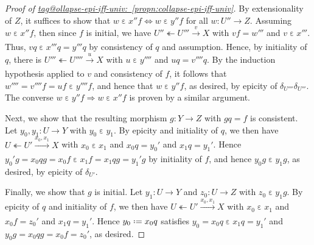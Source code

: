 \documentclass{amsart}
\makeatletter
\newcommand\defeq{\mathrel{\vcenter{\baselineskip0.5ex \lineskiplimit0pt \hbox{.}\hbox{.}}} =}
\newcommand\ein{\mathrel{\varepsilon}}
\newcommand\oot{\twoheadleftarrow}
\newcommand\ToT{\Leftrightarrow}
\newcommand\tox[2][]{\xrightarrow[#1]{#2}}
\newcommand\To{\Rightarrow}
\newcommand\tagword[1]{\csname tag@#1\endcsname}
\def\label@tag#1:#2\@nil{#1}
\newcommand\labeltag[1]{\label@tag#1:\@nil}
\newcommand\jref[1]{%
  \texorpdfstring%
    {\hyperref[#1]{\tagword{\labeltag{#1}}~\ref*{#1}}}%
    {\tagword{\labeltag{#1}}~\ref*{#1}}%
}
\theoremstyle{definition}
\theoremstyle{remark}
\theoremstyle{plainwithref}
\makeatother
\begin{document}
\begin{proof}[Proof of \jref{propn:collapse-epi-iff-univ}]
  By extensionality of \( Z \), it suffices to show that \( w \ein x'' f \ToT w \ein y'' f \) for all \( w \colon U'' \to Z \).
  Assuming \( w \ein x'' f \), then since \( f \) is initial, we have \( U'' \oot U''' \tox{v} X \) with \( v f = w''' \) and \( v \ein x''' \).
  Thus, \( v q \ein x''' q = y''' q \) by consistency of \( q \) and assumption.
  Hence, by initiality of \( q \), there is \( U''' \oot U'''' \tox{u} X \) with \( u \ein y'''' \) and \( u q = v'''' q \).
  By the induction hypothesis applied to \( v \) and consistency of \( f \), it follows that \( w'''' = v'''' f = u f \ein y'''' f \), and hence that \( w \ein y'' f \), as desired, by epicity of \( \delta_{U''''} \delta_{U'''} \).
  The converse \( w \ein y'' f \To w \ein x'' f \) is proven by a similar argument.

  Next, we show that the resulting morphism \( g \colon Y \to Z \) with \( g q = f \) is consistent.
  Let \( y_0, y_1 \colon U \to Y \) with \( y_0 \ein y_1 \).
  By epicity and initiality of \( q \), we then have \( U \oot U' \tox{x_0,x_1} X \) with \( x_0 \ein x_1 \) and \( x_0 q = y_0'  \) and \( x_1 q = y_1' \).
  Hence \( y_0' g = x_0 q g = x_0 f \ein x_1 f = x_1 q g = y_1' g \) by initiality of \( f \), and hence \( y_0 g \ein y_1 g \), as desired, by epicity of \( \delta_{U'} \).

  Finally, we show that \( g \) is initial.
  Let \( y_1 \colon U \to Y \) and \( z_0 \colon U \to Z \) with \( z_0 \ein y_1 g \).
  By epicity of \( q \) and initiality of \( f \), we then have \( U \oot U' \tox{x_0,x_1} X \) with \( x_0 \ein x_1 \) and \( x_0 f = z_0' \) and \( x_1 q = y_1' \).
  Hence \( y_0 \defeq x_0 q \) satisfies \( y_0 = x_0 q \ein x_1 q = y_1' \) and \( y_0 g = x_0 q g = x_0 f = z_0' \), as desired.
\end{proof}
\end{document}
